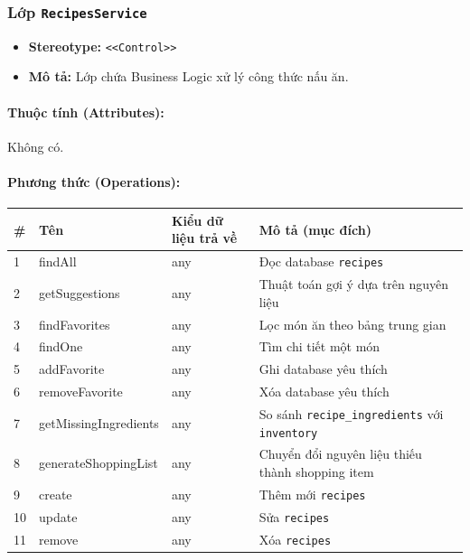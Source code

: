 \documentclass[12pt,a4paper]{article}
\begin{document}
\subsubsection{Lớp \texttt{RecipesService}}

\begin{itemize}[leftmargin=*]
    \item \textbf{Stereotype:} \texttt{\textless{}\textless{}Control\textgreater{}\textgreater{}}
    \item \textbf{Mô tả:} Lớp chứa Business Logic xử lý công thức nấu ăn.
\end{itemize}

\paragraph{Thuộc tính (Attributes):}
Không có.

\paragraph{Phương thức (Operations):}
\begin{longtable}{|p{0.6cm}|p{5.0cm}|p{2.8cm}|p{5.4cm}|}
\hline
\textbf{\#} & \textbf{Tên} & \textbf{Kiểu dữ liệu trả về} & \textbf{Mô tả (mục đích)} \\ \hline
\endhead
1 & findAll & any & Đọc database \texttt{recipes} \\ \hline
2 & getSuggestions & any & Thuật toán gợi ý dựa trên nguyên liệu \\ \hline
3 & findFavorites & any & Lọc món ăn theo bảng trung gian \\ \hline
4 & findOne & any & Tìm chi tiết một món \\ \hline
5 & addFavorite & any & Ghi database yêu thích \\ \hline
6 & removeFavorite & any & Xóa database yêu thích \\ \hline
7 & getMissingIngredients & any & So sánh \texttt{recipe\_ingredients} với \texttt{inventory} \\ \hline
8 & generateShoppingList & any & Chuyển đổi nguyên liệu thiếu thành shopping item \\ \hline
9 & create & any & Thêm mới \texttt{recipes} \\ \hline
10 & update & any & Sửa \texttt{recipes} \\ \hline
11 & remove & any & Xóa \texttt{recipes} \\ \hline
\end{longtable}
\end{document}

